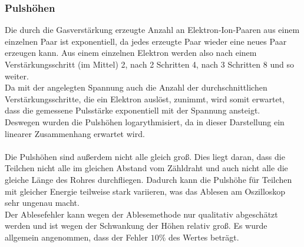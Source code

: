 \documentclass[12pt,a4paper]{article}
\begin{document}
\subsubsection{Pulshöhen}

Die durch die Gasverstärkung erzeugte Anzahl an Elektron-Ion-Paaren aus einem einzelnen Paar ist exponentiell, da jedes erzeugte Paar wieder eine neues Paar erzeugen kann. Aus einem einzelnen Elektron werden also nach einem Verstärkungsschritt (im Mittel) 2, nach 2 Schritten 4, nach 3 Schritten 8 und so weiter.\\
Da mit der angelegten Spannung auch die Anzahl der durchschnittlichen Verstärkungsschritte, die ein Elektron auslöst, zunimmt, wird somit erwartet, dass die gemessene Pulsstärke exponentiell mit der Spannung ansteigt.\\
Deswegen wurden die Pulshöhen logarythmisiert, da in dieser Darstellung ein linearer Zusammenhang erwartet wird.\\
\\
Die Pulshöhen sind außerdem nicht alle gleich groß. Dies liegt daran, dass die Teilchen nicht alle im gleichen Abstand vom Zähldraht und auch nicht alle die gleiche Länge des Rohres durchfliegen. Dadurch kann die Pulshöhe für Teilchen mit gleicher Energie teilweise stark variieren, was das Ablesen am Oszilloskop sehr ungenau macht.\\
Der Ablesefehler kann wegen der Ablesemethode nur qualitativ abgeschätzt werden und ist wegen der Schwankung der Höhen relativ groß. Es wurde allgemein angenommen, dass der Fehler $10\%$ des Wertes beträgt.
\end{document}
